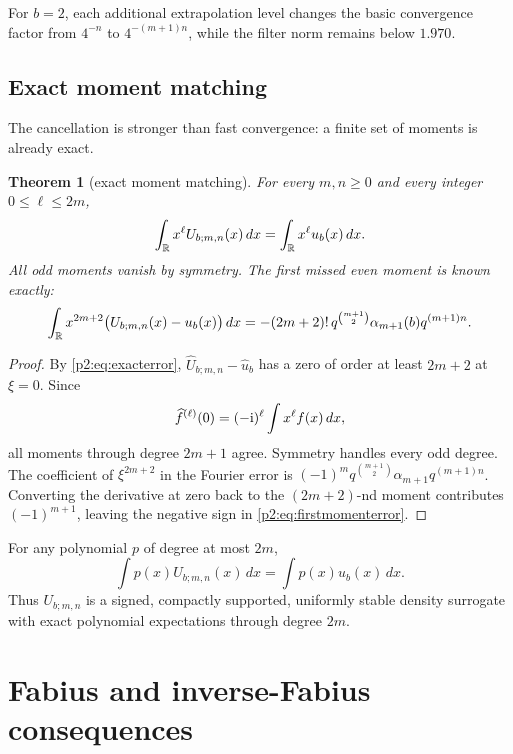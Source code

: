\documentclass[11pt,oneside]{article}
\numberwithin{equation}{section}
\newtheorem{theorem}{Theorem}[section]
\theoremstyle{definition}
\theoremstyle{remark}
\begin{document}
For \(b=2\), each additional extrapolation level changes the basic convergence
factor from \(4^{-n}\) to \(4^{-(m+1)n}\), while the filter norm remains below
\(1.970\).

\subsection{Exact moment matching}

The cancellation is stronger than fast convergence: a finite set of moments is
already exact.

\begin{theorem}[exact moment matching]
\label{p2:thm:moments}
For every \(m,n\geq0\) and every integer \(0\leq\ell\leq2m\),
\begin{equation}
 \int_{\mathbb{R}}x^\ell U_{b;m,n}(x)\,dx
 =\int_{\mathbb{R}}x^\ell u_b(x)\,dx.
 \label{p2:eq:momentmatch}
\end{equation}
All odd moments vanish by symmetry. The first missed even moment is known
exactly:
\begin{equation}
 \int_{\mathbb{R}}x^{2m+2}\bigl(U_{b;m,n}(x)-u_b(x)\bigr)\,dx
 =-(2m+2)!\,q^{\binom{m+1}{2}}
 \alpha_{m+1}(b)q^{(m+1)n}.
 \label{p2:eq:firstmomenterror}
\end{equation}
\end{theorem}

\begin{proof}
By \eqref{p2:eq:exacterror},
\(\widehat U_{b;m,n}-\widehat u_b\) has a zero of order at least \(2m+2\) at
\(\xi=0\). Since
\[
 \widehat f^{(\ell)}(0)=(-\mathrm{i})^\ell\int x^\ell f(x)\,dx,
\]
all moments through degree \(2m+1\) agree. Symmetry handles every odd degree.
The coefficient of \(\xi^{2m+2}\) in the Fourier error is
\((-1)^mq^{\binom{m+1}{2}}\alpha_{m+1}q^{(m+1)n}\). Converting the derivative
at zero back to the \((2m+2)\)-nd moment contributes \((-1)^{m+1}\), leaving the
negative sign in \eqref{p2:eq:firstmomenterror}.
\end{proof}

\begin{remark}
For any polynomial \(p\) of degree at most \(2m\),
\[
 \int p(x)U_{b;m,n}(x)\,dx=\int p(x)u_b(x)\,dx.
\]
Thus \(U_{b;m,n}\) is a signed, compactly supported, uniformly stable density
surrogate with exact polynomial expectations through degree \(2m\).
\end{remark}

\section{Fabius and inverse-Fabius consequences}
\label{p2:sec:fabius}
\end{document}
